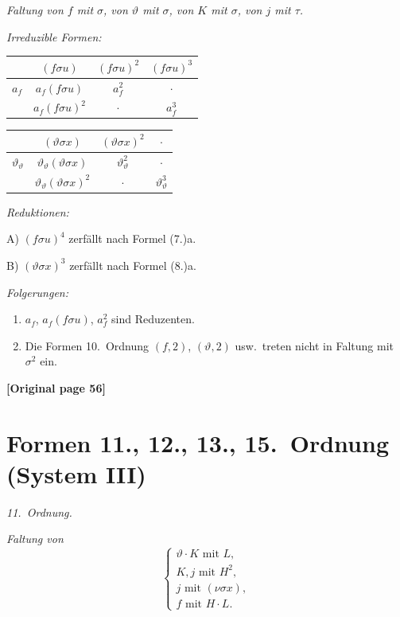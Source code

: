 \documentclass[12pt,a4paper]{article}
\begin{document}
\textit{Faltung von $f$ mit $\sigma$, von $\vartheta$ mit $\sigma$, von $K$ mit $\sigma$, von $j$ mit $\tau$.}

\textit{Irreduzible Formen:}
\begin{center}
\begin{tabular}{c|ccc}
& $(f\sigma u)$ & $(f\sigma u)^2$ & $(f\sigma u)^3$ \\
\hline
$a_f$ & $a_f(f\sigma u)$ & $a_f^2$ & $\cdot$ \\
& $a_f(f\sigma u)^2$ & $\cdot$ & $a_f^3$
\end{tabular}
\end{center}

\begin{center}
\begin{tabular}{c|ccc}
& $(\vartheta \sigma x)$ & $(\vartheta \sigma x)^2$ & $\cdot$ \\
\hline
$\vartheta_\vartheta$ & $\vartheta_\vartheta(\vartheta\sigma x)$ & $\vartheta_\vartheta^2$ & $\cdot$ \\
& $\vartheta_\vartheta(\vartheta\sigma x)^2$ & $\cdot$ & $\vartheta_\vartheta^3$
\end{tabular}
\end{center}

\textit{Reduktionen:}

A) $(f\sigma u)^4$ zerfällt nach Formel (7.)a.

B) $(\vartheta\sigma x)^3$ zerfällt nach Formel (8.)a.

\textit{Folgerungen:}
\begin{enumerate}
\item[1)] $a_f$, $a_f(f\sigma u)$, $a_f^2$ sind Reduzenten.
\item[2)] Die Formen 10.\ Ordnung $(f,2)$, $(\vartheta,2)$ usw.\ treten nicht in Faltung mit $\sigma^2$ ein.
\end{enumerate}

\noindent\textbf{[Original page 56]}

\section{Formen 11., 12., 13., 15.\ Ordnung (System III)}

\textit{11.\ Ordnung.}

\textit{Faltung von}
\[\begin{cases}
\vartheta \cdot K \text{ mit } L,\\
K, j \text{ mit } H^2,\\
j \text{ mit } (\nu\sigma x),\\
f \text{ mit } H \cdot L.
\end{cases}\]
\end{document}
